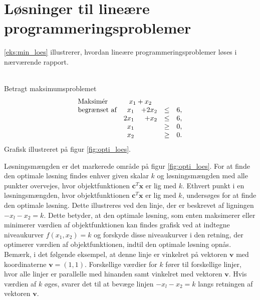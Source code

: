 \section{Løsninger til lineære programmeringsproblemer}
%
\label{heeeeejjulle}
\ref{eks:min_loes} illustrerer, hvordan lineære programmeringsproblemer løses i nærværende rapport.
\\\\
\begin{eks}\label{eks:min_loes}
Betragt maksimumsproblemet
%
\begin{align*}
\begin{array}{lrrlr}
\text{Maksimér}		&	\multicolumn{2}{c}{x_1+x_2}  &\\
\text{begrænset af}	&x_1& + 2x_2			&\leq 	& 6,\\
					&2x_1& + x_2			&\leq	& 6,\\
					&x_1&    				&\geq	& 0,\\
					&x_2&    				&\geq	& 0.\\
\end{array}
\end{align*}
%
Grafisk illustreret på figur \ref{fig:opti_loes}.
%

%
\noindent
Løsningsmængden er det markerede område på figur \ref{fig:opti_loes}. 
For at finde den optimale løsning findes enhver given skalar $k$ og løsningsmængden med alle punkter overvejes, hvor objektfunktionen $\textbf{c}^T\textbf{x}$ er lig med $k$. 
Ethvert punkt i en løsningsmængden, hvor objektfunktionen $\textbf{c}^T\textbf{x}$ er lig med $k$, undersøges for at finde den optimale løsning.
Dette illustreres ved den linje, der er beskrevet af ligningen $-x_l-x_2=k$. 
Dette betyder, at den optimale løsning, som enten maksimerer eller minimerer værdien af objektfunktionen kan findes grafisk ved at indtegne niveaukurver $f(x_1, x_2)=k$ og forskyde disse niveaukurver i den retning, der optimerer værdien af objektfunktionen, indtil den optimale løsning opnås.  
Bemærk, i det følgende eksempel, at denne linje er vinkelret på vektoren $\textbf{v}$ med koordinaterne $\textbf{v}=(1,1)$.
Forskellige værdier for $k$ fører til forskellige linjer, hvor  alle linjer er parallelle med hinanden samt vinkelret med vektoren $\textbf{v}$. 
Hvis værdien af $k$ øges, svarer det til at bevæge linjen $-x_l-x_2=k$ langs retningen af vektoren $\textbf{v}$. 

\end{eks}

